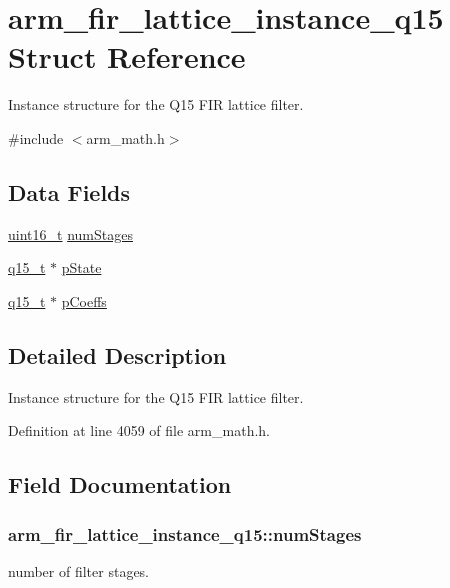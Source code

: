 \hypertarget{structarm__fir__lattice__instance__q15}{\section{arm\-\_\-fir\-\_\-lattice\-\_\-instance\-\_\-q15 Struct Reference}
\label{structarm__fir__lattice__instance__q15}
}


Instance structure for the Q15 F\-I\-R lattice filter.  




{\ttfamily \#include $<$arm\-\_\-math.\-h$>$}

\subsection*{Data Fields}
\begin{DoxyCompactItemize}
\item 
\hyperlink{stdint_8h_a273cf69d639a59973b6019625df33e30}{uint16\-\_\-t} \hyperlink{structarm__fir__lattice__instance__q15_a38b179138d6a6c9cac4f8f79b6fd5357}{num\-Stages}
\item 
\hyperlink{arm__math_8h_ab5a8fb21a5b3b983d5f54f31614052ea}{q15\-\_\-t} $\ast$ \hyperlink{structarm__fir__lattice__instance__q15_a37b90dea2bc3ee7c9951a9fe74db0cbb}{p\-State}
\item 
\hyperlink{arm__math_8h_ab5a8fb21a5b3b983d5f54f31614052ea}{q15\-\_\-t} $\ast$ \hyperlink{structarm__fir__lattice__instance__q15_a78f872826140069cf67836fff87360bc}{p\-Coeffs}
\end{DoxyCompactItemize}


\subsection{Detailed Description}
Instance structure for the Q15 F\-I\-R lattice filter. 

Definition at line 4059 of file arm\-\_\-math.\-h.



\subsection{Field Documentation}
\hypertarget{structarm__fir__lattice__instance__q15_a38b179138d6a6c9cac4f8f79b6fd5357}{
\subsubsection[{num\-Stages}]{ arm\-\_\-fir\-\_\-lattice\-\_\-instance\-\_\-q15\-::num\-Stages}}\label{structarm__fir__lattice__instance__q15_a38b179138d6a6c9cac4f8f79b6fd5357}
number of filter stages. 

